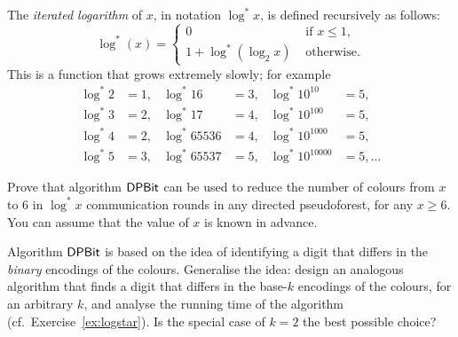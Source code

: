 \begin{ex}\label{ex:logstar}
    The \emph{iterated logarithm} of $x$, in notation $\log^* x$, is defined recursively as follows:
    \[
        \log^*(x) = \begin{cases}
            0 & \text{ if $x \le 1$}, \\
            1 + \log^*(\log_2 x) & \text{ otherwise}.
        \end{cases}
    \]
    This is a function that grows extremely slowly; for example
    \begin{align*}
        \log^* 2 &= 1, &
        \log^* 16 &= 3, &
        \log^* 10^{10} &= 5, \\
        \log^* 3 &= 2, &
        \log^* 17 &= 4, &
        \log^* 10^{100} &= 5, \\
        \log^* 4 &= 2, &
        \log^* 65536 &= 4, &
        \log^* 10^{1000} &= 5, \\
        \log^* 5 &= 3, &
        \log^* 65537 &= 5, &
        \log^* 10^{10000} &= 5, \dotsc
    \end{align*}

    Prove that algorithm $\textsf{DPBit}$ can be used to reduce the number of colours from $x$ to $6$ in $\log^* x$ communication rounds in any directed pseudoforest, for any $x \ge 6$. You can assume that the value of $x$ is known in advance.
    
\end{ex}

\begin{ex}\label{ex:dpbit-base}
    Algorithm $\textsf{DPBit}$ is based on the idea of identifying a digit that differs in the \emph{binary} encodings of the colours. Generalise the idea: design an analogous algorithm that finds a digit that differs in the base-$k$ encodings of the colours, for an arbitrary $k$, and analyse the running time of the algorithm (cf.\ Exercise~\ref{ex:logstar}). Is the special case of $k = 2$ the best possible choice?
\end{ex}

